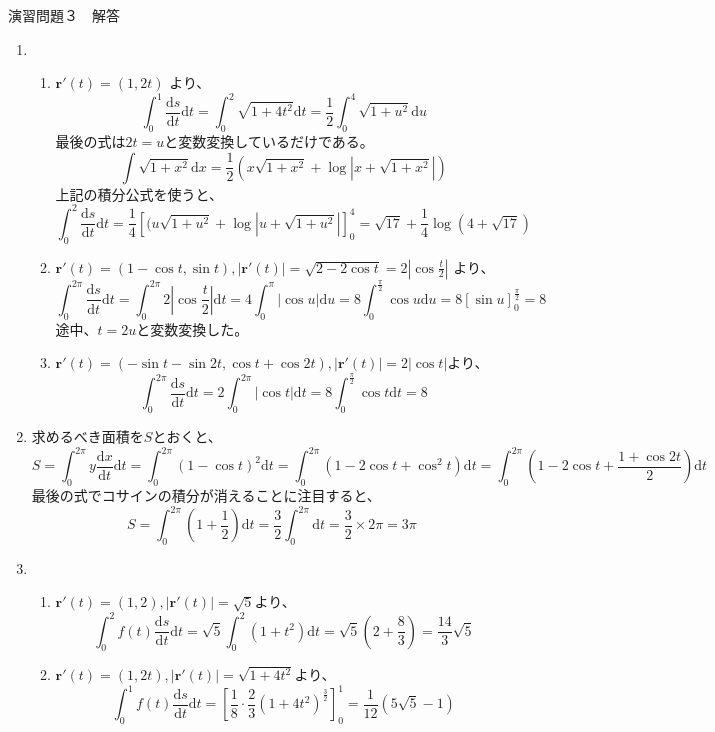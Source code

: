 \documentclass{jarticle}
\def\d{\mathrm d}
\begin{document}
\begin{center} {\Large 演習問題３　解答} \end{center}
\begin{enumerate}
  \item
    \begin{enumerate}
      \item
        $ \bm r' (t) = ( 1, 2t ) $ より、
        \[ \int_0^1 \frac{\d s}{\d t} \d t = \int_0^2 \sqrt{1+4t^2} \d t  = \frac{1}{2} \int_0^4 \sqrt{1+u^2} \d u \]
        最後の式は$2t = u$と変数変換しているだけである。
        \[ \int \sqrt{1+x^2} \d x = \frac{1}{2} (x \sqrt{1+x^2} + \log |x+\sqrt{1+x^2}|)\]
        上記の積分公式を使うと、
        \[ \int_0^2 \frac{\d s}{\d t} \d t = \frac{1}{4} \left[ (u \sqrt{1+u^2} + \log{|u+\sqrt{1+u^2}|} \right]^4_0 = \sqrt{17} + \frac{1}{4} \log{(4+\sqrt{17})} \]
      
      \item
        $ \bm r' (t) = ( 1-\cos t, \sin t ), |\bm r'(t)| = \sqrt{2-2\cos t} = 2 \left| \cos \frac{t}{2} \right|$ より、
        \[ \int_0^{2\pi} \frac{\d s}{\d t} \d t = \int_0^{2\pi} 2 | \cos \frac{t}{2} | \d t = 4 \int_0^\pi | \cos u | \d u = 8 \int_0^{\frac{\pi}{2}} \cos u \d u = 8 \left[ \sin u \right]_0^{\frac{\pi}{2}} = 8 \]
        途中、$t = 2u$と変数変換した。
      \item
        $ \bm r'(t)=(-\sin t - \sin 2t, \cos t + \cos 2t), |\bm r'(t)|=2| \cos t |$より、
        \[ \int_0^{2\pi} \frac{\d s}{\d t} \d t = 2 \int_0^{2\pi} |\cos t| \d t = 8 \int_0^{\frac{\pi}{2}} \cos t \d t = 8\]
    \end{enumerate}
    
  \item
    求めるべき面積を$S$とおくと、
    \[ S = \int_0^{2\pi} y \frac{\d x}{\d t} \d t = \int_0^{2\pi} (1-\cos t)^2 \d t = \int_0^{2\pi} ( 1 - 2 \cos t + \cos^2 t ) \d t = \int_0^{2\pi} ( 1 - 2 \cos t + \frac{1+\cos 2t}{2}) \d t \] 
    最後の式でコサインの積分が消えることに注目すると、
    \[ S = \int_0^{2\pi} ( 1 + \frac{1}{2} ) \d t = \frac{3}{2} \int_0^{2\pi} \d t = \frac{3}{2} \times 2 \pi = 3 \pi \]
  \item
    \begin{enumerate}
      \item
        $\bm r'(t) = (1,2), |\bm r'(t)| = \sqrt{5}$より、
        \[ \int_0^2 f(t) \frac{\d s}{\d t} \d t = \sqrt{5} \int_0^2 (1+t^2) \d t = \sqrt{5} (2 + \frac{8}{3}) = \frac{14}{3} \sqrt{5}\]
      \item
        $\bm r'(t) = (1,2t), |\bm r'(t)| = \sqrt{1+4t^2}$より、
        \[ \int_0^1 f(t) \frac{\d s}{\d t} \d t = \left[ \frac{1}{8} \cdot \frac{2}{3} (1+4t^2)^\frac{3}{2} \right]_0^1 = \frac{1}{12} ( 5\sqrt{5} - 1 ) \]
    \end{enumerate}
\end{enumerate}
\end{document}
